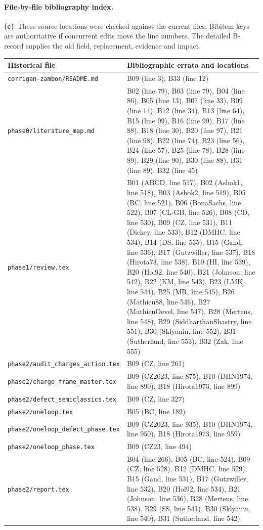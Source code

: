 \documentclass[11pt,a4paper]{article}
\newcommand{\C}{\textbf{(c)}\ }
\newcommand{\file}[1]{\nolinkurl{#1}}
\begin{document}
\paragraph{File-by-file bibliography index.}
\C These source locations were checked against the current files. Bibitem
keys are authoritative if concurrent edits move the line numbers. The detailed
B-record supplies the old field, replacement, evidence and impact.
\small
\begin{longtable}{@{}L{5.6cm}L{9.4cm}@{}}
\toprule Historical file & Bibliographic errata and locations\\\midrule\endhead
\file{corrigan-zambon/README.md} & B09 (line 3), B33 (line 12)\\
\file{phase0/literature_map.md} & B02 (line 79), B03 (line 79), B04 (line 86), B05 (line 13), B07 (line 33), B09 (line 14), B12 (line 34), B13 (line 64), B15 (line 99), B16 (line 99), B17 (line 88), B18 (line 30), B20 (line 97), B21 (line 98), B22 (line 74), B23 (line 56), B24 (line 57), B25 (line 78), B28 (line 89), B29 (line 90), B30 (line 88), B31 (line 89), B32 (line 45)\\
\file{phase1/review.tex} & B01 (ABCD, line 517), B02 (Ashok1, line 518), B03 (Ashok2, line 519), B05 (BC, line 521), B06 (BonaSachs, line 522), B07 (CL-GB, line 526), B08 (CD, line 530), B09 (CZ, line 531), B11 (Dickey, line 533), B12 (DMHC, line 534), B14 (DS, line 535), B15 (Gand, line 536), B17 (Gutzwiller, line 537), B18 (Hirota73, line 538), B19 (HI, line 539), B20 (Hol92, line 540), B21 (Johnson, line 542), B22 (KM, line 543), B23 (LMK, line 544), B25 (MR, line 545), B26 (Mathieu88, line 546), B27 (MathieuOevel, line 547), B28 (Mertens, line 548), B29 (SiddharthanShastry, line 551), B30 (Sklyanin, line 552), B31 (Sutherland, line 553), B32 (Zak, line 555)\\
\file{phase2/audit_charges_action.tex} & B09 (CZ, line 261)\\
\file{phase2/charge_frame_master.tex} & B09 (CZ2023, line 875), B10 (DHN1974, line 890), B18 (Hirota1973, line 899)\\
\file{phase2/defect_semiclassics.tex} & B09 (CZ, line 327)\\
\file{phase2/oneloop.tex} & B05 (BC, line 189)\\
\file{phase2/oneloop_defect_phase.tex} & B09 (CZ2023, line 935), B10 (DHN1974, line 950), B18 (Hirota1973, line 959)\\
\file{phase2/oneloop_phase.tex} & B09 (CZ23, line 494)\\
\file{phase2/report.tex} & B04 (line 266), B05 (BC, line 524), B09 (CZ, line 528), B12 (DMHC, line 529), B15 (Gand, line 531), B17 (Gutzwiller, line 532), B20 (Hol92, line 534), B21 (Johnson, line 536), B28 (Mertens, line 538), B29 (SS, line 541), B30 (Sklyanin, line 540), B31 (Sutherland, line 542)\\

\end{longtable}
\end{document}
